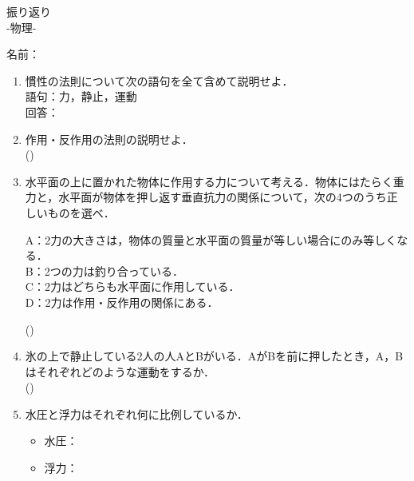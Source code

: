 \documentclass[fontsize=15pt]{jlreq}
\newcommand{\m}[1]{\raisebox{0.1em}{\textcircled{\scriptsize #1}}}
\begin{document}
\begin{center}
{\LARGE {振り返り}} \\
-物理\m{4}- %
\end{center}
\vspace{1em}
\begin{flushright}
名前：\underline{\hspace{5cm}}
\end{flushright}

\begin{enumerate}
    \item 慣性の法則について次の語句を全て含めて説明せよ．\\
    \small 語句：力，静止，運動 \\\normalsize
    回答：
    \vspace{5em} 

    \item 作用・反作用の法則の説明せよ．\\
    (\hspace{15cm})
    \vspace{2em} 

    \item 水平面の上に置かれた物体に作用する力について考える．物体にはたらく重力と，水平面が物体を押し返す垂直抗力の関係について，次の4つのうち正しいものを選べ．
    \begin{itemize}
      \noindent  A：2力の大きさは，物体の質量と水平面の質量が等しい場合にのみ等しくなる．\\
        B：2つの力は釣り合っている．\\
        C：2力はどちらも水平面に作用している．\\
        D：2力は作用・反作用の関係にある．
    \end{itemize}
    (\hspace{2cm})
    \vspace{2em} 

    \item 氷の上で静止している2人の人AとBがいる．AがBを前に押したとき，A，Bはそれぞれどのような運動をするか．\\
    (\hspace{15cm})
    \vspace{2em}

    \item 水圧と浮力はそれぞれ何に比例しているか．
    \begin{itemize}
        \item 水圧：
        \item 浮力：
    \end{itemize}
    \vspace{2em}  

\end{enumerate}
\end{document}
